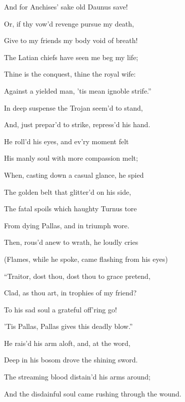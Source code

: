 And for Anchises’ sake old Daunus save!

Or, if thy vow’d revenge pursue my death,

Give to my friends my body void of breath!

The Latian chiefs have seen me beg my life;

Thine is the conquest, thine the royal wife:

Against a yielded man, ’tis mean ignoble strife.”

In deep suspense the Trojan seem’d to stand,

And, just prepar’d to strike, repress’d his hand.

He roll’d his eyes, and ev’ry moment felt

His manly soul with more compassion melt;

When, casting down a casual glance, he spied

The golden belt that glitter’d on his side,

The fatal spoils which haughty Turnus tore

From dying Pallas, and in triumph wore.

Then, rous’d anew to wrath, he loudly cries

(Flames, while he spoke, came flashing from his eyes)

“Traitor, dost thou, dost thou to grace pretend,

Clad, as thou art, in trophies of my friend?

To his sad soul a grateful off’ring go!

’Tis Pallas, Pallas gives this deadly blow.”

He rais’d his arm aloft, and, at the word,

Deep in his bosom drove the shining sword.

The streaming blood distain’d his arms around;

And the disdainful soul came rushing through the wound.

